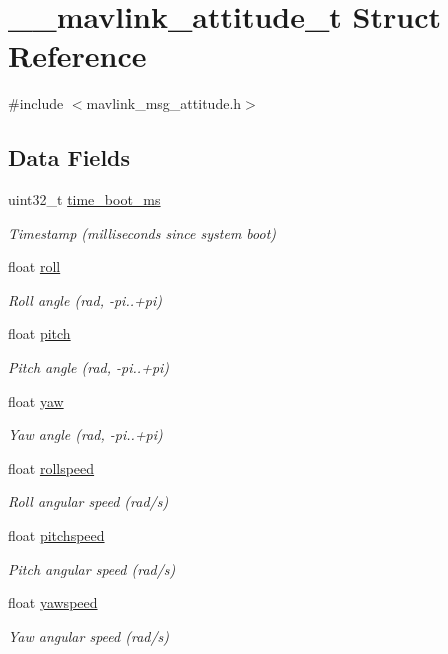 \hypertarget{struct____mavlink__attitude__t}{\section{\+\_\+\+\_\+mavlink\+\_\+attitude\+\_\+t Struct Reference}
\label{struct____mavlink__attitude__t}
}


{\ttfamily \#include $<$mavlink\+\_\+msg\+\_\+attitude.\+h$>$}

\subsection*{Data Fields}
\begin{DoxyCompactItemize}
\item 
uint32\+\_\+t \hyperlink{struct____mavlink__attitude__t_a7330cabdd19ca8d3dc27ff1a6b585326}{time\+\_\+boot\+\_\+ms}
\begin{DoxyCompactList}\small\item\em Timestamp (milliseconds since system boot) \end{DoxyCompactList}\item 
float \hyperlink{struct____mavlink__attitude__t_a5ac57ac7109bca27a72d5a4128a8010f}{roll}
\begin{DoxyCompactList}\small\item\em Roll angle (rad, -\/pi..+pi) \end{DoxyCompactList}\item 
float \hyperlink{struct____mavlink__attitude__t_ad9be17d1bb5941060e7c81634ebec51c}{pitch}
\begin{DoxyCompactList}\small\item\em Pitch angle (rad, -\/pi..+pi) \end{DoxyCompactList}\item 
float \hyperlink{struct____mavlink__attitude__t_a24ce486ebd7bde1558ad456684bcbd93}{yaw}
\begin{DoxyCompactList}\small\item\em Yaw angle (rad, -\/pi..+pi) \end{DoxyCompactList}\item 
float \hyperlink{struct____mavlink__attitude__t_ae46e19a3dc0bde80d9a0eddbc0f9315d}{rollspeed}
\begin{DoxyCompactList}\small\item\em Roll angular speed (rad/s) \end{DoxyCompactList}\item 
float \hyperlink{struct____mavlink__attitude__t_a6496f9102154455ef47db7c0cab5c141}{pitchspeed}
\begin{DoxyCompactList}\small\item\em Pitch angular speed (rad/s) \end{DoxyCompactList}\item 
float \hyperlink{struct____mavlink__attitude__t_a2a6cd5ab90b6c939dec690ebf7000101}{yawspeed}
\begin{DoxyCompactList}\small\item\em Yaw angular speed (rad/s) \end{DoxyCompactList}\end{DoxyCompactItemize}


